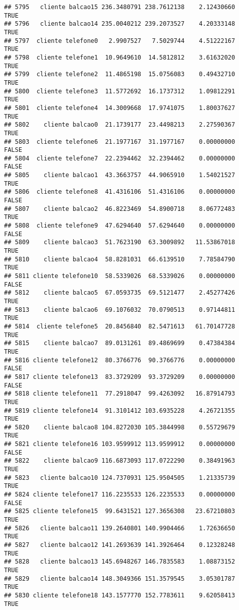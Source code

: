\documentclass[
]{article}
\begin{document}
\begin{verbatim}
## 5795   cliente balcao15 236.3480791 238.7612138    2.12430660     TRUE
## 5796   cliente balcao14 235.0040212 239.2073527    4.20333148     TRUE
## 5797  cliente telefone0   2.9907527   7.5029744    4.51222167     TRUE
## 5798  cliente telefone1  10.9649610  14.5812812    3.61632020     TRUE
## 5799  cliente telefone2  11.4865198  15.0756083    0.49432710     TRUE
## 5800  cliente telefone3  11.5772692  16.1737312    1.09812291     TRUE
## 5801  cliente telefone4  14.3009668  17.9741075    1.80037627     TRUE
## 5802    cliente balcao0  21.1739177  23.4498213    2.27590367     TRUE
## 5803  cliente telefone6  21.1977167  31.1977167    0.00000000    FALSE
## 5804  cliente telefone7  22.2394462  32.2394462    0.00000000    FALSE
## 5805    cliente balcao1  43.3663757  44.9065910    1.54021527     TRUE
## 5806  cliente telefone8  41.4316106  51.4316106    0.00000000    FALSE
## 5807    cliente balcao2  46.8223469  54.8900718    8.06772483     TRUE
## 5808  cliente telefone9  47.6294640  57.6294640    0.00000000    FALSE
## 5809    cliente balcao3  51.7623190  63.3009892   11.53867018     TRUE
## 5810    cliente balcao4  58.8281031  66.6139510    7.78584790     TRUE
## 5811 cliente telefone10  58.5339026  68.5339026    0.00000000    FALSE
## 5812    cliente balcao5  67.0593735  69.5121477    2.45277426     TRUE
## 5813    cliente balcao6  69.1076032  70.0790513    0.97144811     TRUE
## 5814  cliente telefone5  20.8456840  82.5471613   61.70147728     TRUE
## 5815    cliente balcao7  89.0131261  89.4869699    0.47384384     TRUE
## 5816 cliente telefone12  80.3766776  90.3766776    0.00000000    FALSE
## 5817 cliente telefone13  83.3729209  93.3729209    0.00000000    FALSE
## 5818 cliente telefone11  77.2918047  99.4263092   16.87914793     TRUE
## 5819 cliente telefone14  91.3101412 103.6935228    4.26721355     TRUE
## 5820    cliente balcao8 104.8272030 105.3844998    0.55729679     TRUE
## 5821 cliente telefone16 103.9599912 113.9599912    0.00000000    FALSE
## 5822    cliente balcao9 116.6873093 117.0722290    0.38491963     TRUE
## 5823   cliente balcao10 124.7370931 125.9504505    1.21335739     TRUE
## 5824 cliente telefone17 116.2235533 126.2235533    0.00000000    FALSE
## 5825 cliente telefone15  99.6431521 127.3656308   23.67210803     TRUE
## 5826   cliente balcao11 139.2640801 140.9904466    1.72636650     TRUE
## 5827   cliente balcao12 141.2693639 141.3926464    0.12328248     TRUE
## 5828   cliente balcao13 145.6948267 146.7835583    1.08873152     TRUE
## 5829   cliente balcao14 148.3049366 151.3579545    3.05301787     TRUE
## 5830 cliente telefone18 143.1577770 152.7783611    9.62058413     TRUE

\end{verbatim}
\end{document}
